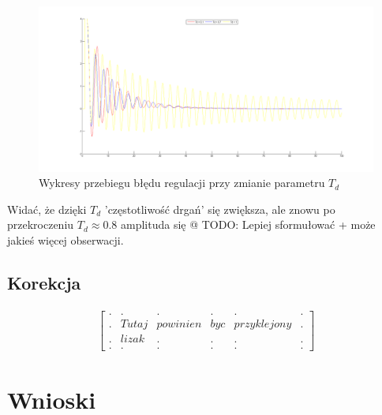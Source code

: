 \documentclass[a4paper,10pt]{article}
\begin{document}
\begin{figure}[!h]
    \centering
	\includegraphics[width=120mm]{CW5-N3C2d1-k18-ti02-td01-1.png}
	\caption{Wykresy przebiegu błędu regulacji przy zmianie parametru $T_d$}
    \label{fig:symulacjaP}
\end{figure}

Widać, że dzięki $T_d$ 'częstotliwość drgań' się zwiększa, ale znowu po przekroczeniu $T_d \approx 0.8$ amplituda się @%
TODO: Lepiej sformułować + może jakieś więcej obserwacji.

\subsection{Korekcja}

\begin{eqnarray}
	\nonumber \left[ \begin{array}{llllll}
		. & . & . & . & . & . \\
		. & Tutaj & powinien & byc & przyklejony & . \\
		. & lizak & . & . & . & . \\
		. & . & . & . & . & .
	\end{array}\right]
\end{eqnarray}

\section{Wnioski}\label{sec:wnioski}
\end{document}
